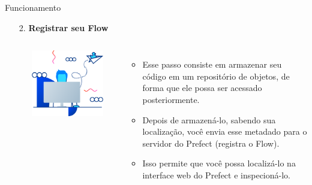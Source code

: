 \documentclass[t,serif]{beamer}
\begin{document}
	\begin{frame}{Funcionamento}
		\begin{enumerate}
			\item[2.] \textbf{Registrar seu Flow}
			\begin{columns}
					\\
					\begin{center}
						\includegraphics[width=\linewidth]{figs/2_2.png}
					\end{center}
					\\
					\begin{itemize}
						\item Esse passo consiste em armazenar seu código em um repositório de objetos, de forma que ele possa ser acessado posteriormente.
						\item Depois de armazená-lo, sabendo sua localização, você envia esse metadado para o servidor do Prefect (registra o Flow).
						\item Isso permite que você possa localizá-lo na interface web do Prefect e inspecioná-lo.
					\end{itemize}
			\end{columns}
		\end{enumerate}
	\end{frame}
	
\end{document}
